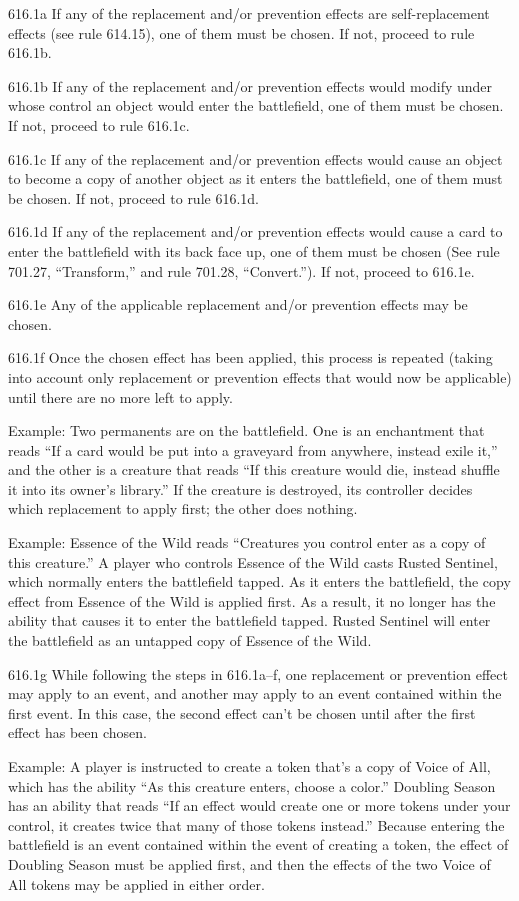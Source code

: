 616.1a If any of the replacement and/or prevention effects are self-replacement effects (see rule 614.15), one of them must be chosen. If not, proceed to rule 616.1b.

616.1b If any of the replacement and/or prevention effects would modify under whose control an object would enter the battlefield, one of them must be chosen. If not, proceed to rule 616.1c.

616.1c If any of the replacement and/or prevention effects would cause an object to become a copy of another object as it enters the battlefield, one of them must be chosen. If not, proceed to rule 616.1d.

616.1d If any of the replacement and/or prevention effects would cause a card to enter the battlefield with its back face up, one of them must be chosen (See rule 701.27, “Transform,” and rule 701.28, “Convert.”). If not, proceed to 616.1e.

616.1e Any of the applicable replacement and/or prevention effects may be chosen.

616.1f Once the chosen effect has been applied, this process is repeated (taking into account only replacement or prevention effects that would now be applicable) until there are no more left to apply.

Example: Two permanents are on the battlefield. One is an enchantment that reads “If a card would be put into a graveyard from anywhere, instead exile it,” and the other is a creature that reads “If this creature would die, instead shuffle it into its owner’s library.” If the creature is destroyed, its controller decides which replacement to apply first; the other does nothing.

Example: Essence of the Wild reads “Creatures you control enter as a copy of this creature.” A player who controls Essence of the Wild casts Rusted Sentinel, which normally enters the battlefield tapped. As it enters the battlefield, the copy effect from Essence of the Wild is applied first. As a result, it no longer has the ability that causes it to enter the battlefield tapped. Rusted Sentinel will enter the battlefield as an untapped copy of Essence of the Wild.

616.1g While following the steps in 616.1a–f, one replacement or prevention effect may apply to an event, and another may apply to an event contained within the first event. In this case, the second effect can’t be chosen until after the first effect has been chosen.

Example: A player is instructed to create a token that’s a copy of Voice of All, which has the ability “As this creature enters, choose a color.” Doubling Season has an ability that reads “If an effect would create one or more tokens under your control, it creates twice that many of those tokens instead.” Because entering the battlefield is an event contained within the event of creating a token, the effect of Doubling Season must be applied first, and then the effects of the two Voice of All tokens may be applied in either order.

